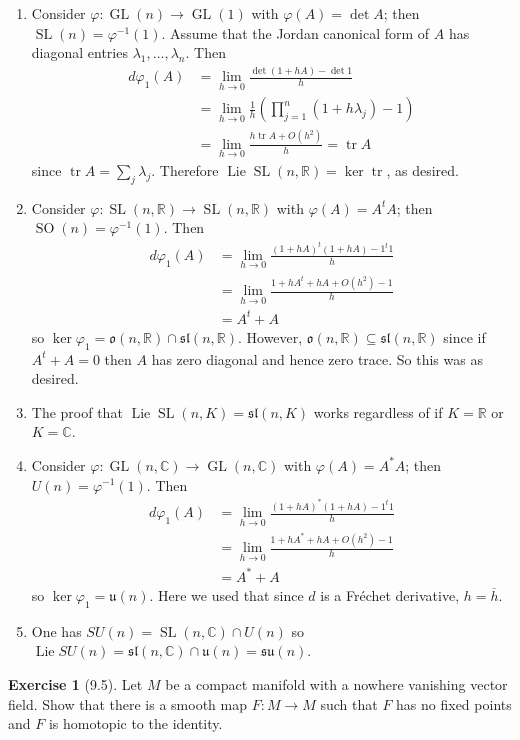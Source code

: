 \documentclass[10pt]{article}
\newcommand{\RR}{\mathbb{R}}
\newcommand{\CC}{\mathbb{C}}
\DeclareMathOperator{\tr}{tr}
\DeclareMathOperator{\Lie}{Lie}
\newcommand{\GL}{\operatorname{GL}}
\newcommand{\SL}{\operatorname{SL}}
\newcommand{\SO}{\operatorname{SO}}
\theoremstyle{definition}
\newtheorem{exer}{Exercise}
\begin{document}
\begin{enumerate}
\item Consider $\varphi: \GL(n) \to \GL(1)$ with $\varphi(A) = \det A$; then $\SL(n) = \varphi^{-1}(1)$.
Assume that the Jordan canonical form of $A$ has diagonal entries $\lambda_1, \dots, \lambda_n$. Then
\begin{align*}
d\varphi_1(A) &= \lim_{h \to 0} \frac{\det(1 + hA) - \det 1}{h} \\
&= \lim_{h \to 0} \frac{1}{h}\left(\prod_{j=1}^n (1 + h\lambda_j) - 1\right)\\
&= \lim_{h \to 0} \frac{h \tr A + O(h^2)}{h} = \tr A
\end{align*}
since $\tr A = \sum_j \lambda_j$. Therefore $\Lie \SL(n, \RR) = \ker \tr$, as desired.
\item Consider $\varphi: \SL(n, \RR) \to \SL(n, \RR)$ with $\varphi(A) = A^tA$; then $\SO(n) = \varphi^{-1}(1)$. Then
\begin{align*}
d\varphi_1(A) &= \lim_{h \to 0} \frac{(1 + hA)^t(1 + hA) - 1^t1}{h} \\
&= \lim_{h \to 0} \frac{1 + hA^t + hA + O(h^2) - 1}{h}\\
&= A^t + A
\end{align*}
so $\ker \varphi_1 = \mathfrak{o}(n, \RR) \cap \mathfrak{sl}(n, \RR)$.
However, $\mathfrak o(n, \RR) \subseteq \mathfrak{sl}(n, \RR)$ since if $A^t + A = 0$ then $A$ has zero diagonal and hence zero trace.
So this was as desired.
\item The proof that $\Lie \SL(n, K) = \mathfrak{sl}(n, K)$ works regardless of if $K = \RR$ or $K = \CC$.
\item Consider $\varphi: \GL(n, \CC) \to \GL(n, \CC)$ with $\varphi(A) = A^*A$; then $U(n) = \varphi^{-1}(1)$. Then
\begin{align*}
d\varphi_1(A) &= \lim_{h \to 0} \frac{(1 + hA)^*(1 + hA) - 1^t1}{h} \\
&= \lim_{h \to 0} \frac{1 + hA^* + hA + O(h^2) - 1}{h}\\
&= A^* + A
\end{align*}
so $\ker \varphi_1 = \mathfrak u(n)$. Here we used that since $d$ is a Fr\'echet derivative, $h = \overline h$.
\item One has $SU(n) = \SL(n, \CC) \cap U(n)$ so $\Lie SU(n) = \mathfrak{sl}(n, \CC) \cap \mathfrak u(n) = \mathfrak{su}(n)$.
\end{enumerate}

\begin{exer}[9.5]
Let $M$ be a compact manifold with a nowhere vanishing vector field. Show that there is a smooth map $F: M \to M$ such that $F$ has no fixed points and $F$ is homotopic to the identity.
\end{exer}
\end{document}
